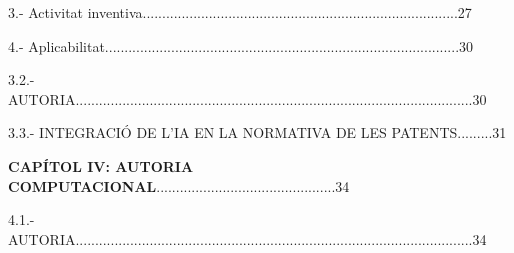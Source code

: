 \documentclass[12pt]{article}
\renewcommand{\_}{\kern-1.5pt\textunderscore\kern-1.5pt}
\begin{document}
\vspace{\baselineskip}
\begin{adjustwidth}{0.49in}{0.0in}
\begin{justify}
3.- Activitat inventiva.................................................................................27
\end{justify}\par

\end{adjustwidth}


\vspace{\baselineskip}
\begin{adjustwidth}{0.49in}{0.0in}
\begin{justify}
4.- Aplicabilitat...........................................................................................30
\end{justify}\par

\end{adjustwidth}


\vspace{\baselineskip}
\begin{justify}
3.2.- AUTORIA......................................................................................................30
\end{justify}\par


\vspace{\baselineskip}
\begin{justify}
3.3.- INTEGRACIÓ DE L’IA EN LA NORMATIVA DE LES PATENTS.........31
\end{justify}\par


\vspace{\baselineskip}

\vspace{\baselineskip}
\begin{justify}
\textbf{CAPÍTOL IV: AUTORIA COMPUTACIONAL}..............................................34
\end{justify}\par


\vspace{\baselineskip}

\vspace{\baselineskip}
\begin{justify}
4.1.- AUTORIA......................................................................................................34
\end{justify}\par
\end{document}
